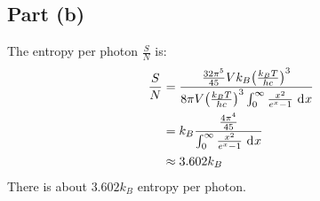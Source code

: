 \documentclass{article}
\begin{document}
\subsection*{Part (b)}
The entropy per photon $\frac{S}{N}$ is:
\begin{equation}
    \begin{split}
        \frac{S}{N} & = \frac{\frac{32\pi^5}{45} Vk_B{\left(\frac{k_BT}{hc}\right)}^3}{8\pi V{\left(\frac{k_BT}{hc}\right)}^3\int_0^{\infty} \frac{x^2}{e^x - 1} \, \diff{x}} \\
        & = k_B\frac{\frac{4\pi^4}{45}}{\int_0^{\infty} \frac{x^2}{e^x - 1} \, \diff{x}} \\
        & \approx 3.602k_B
    \end{split}
\end{equation}
There is about $3.602k_B$ entropy per photon.
\end{document}
